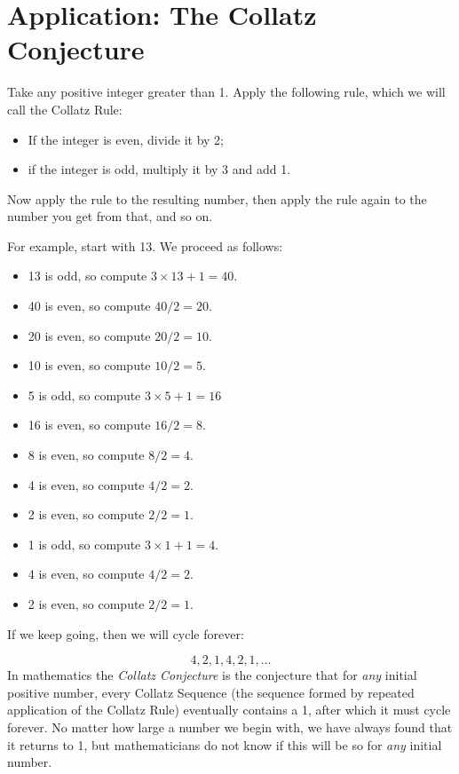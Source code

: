 \documentclass[]{book}
\providecommand{\tightlist}{%
  \setlength{\itemsep}{0pt}\setlength{\parskip}{0pt}}
\theoremstyle{definition}
\theoremstyle{definition}
\theoremstyle{definition}
\theoremstyle{remark}
\begin{document}
{\section{Application: The Collatz Conjecture}\label{collatz-conjecture}

Take any positive integer greater than 1. Apply the following rule,
which we will call the Collatz Rule:

\begin{itemize}
\tightlist
\item
  If the integer is even, divide it by 2;
\item
  if the integer is odd, multiply it by 3 and add 1.
\end{itemize}

Now apply the rule to the resulting number, then apply the rule again to
the number you get from that, and so on.

For example, start with 13. We proceed as follows:

\begin{itemize}
\tightlist
\item
  13 is odd, so compute \(3 \times 13 + 1 = 40\).
\item
  40 is even, so compute \(40/2 = 20\).
\item
  20 is even, so compute \(20/2 = 10\).
\item
  10 is even, so compute \(10/2 = 5\).
\item
  5 is odd, so compute \(3 \times 5+ 1 = 16\)
\item
  16 is even, so compute \(16/2 = 8\).
\item
  8 is even, so compute \(8/2 = 4\).
\item
  4 is even, so compute \(4/2 = 2\).
\item
  2 is even, so compute \(2/2 = 1\).
\item
  1 is odd, so compute \(3 \times 1 + 1 = 4\).
\item
  4 is even, so compute \(4/2 = 2\).
\item
  2 is even, so compute \(2/2 = 1\).
\end{itemize}

If we keep going, then we will cycle forever:

\[4, 2, 1, 4, 2, 1, \ldots\] In mathematics the \emph{Collatz
Conjecture} is the conjecture that for \emph{any} initial positive
number, every Collatz Sequence (the sequence formed by repeated
application of the Collatz Rule) eventually contains a 1, after which it
must cycle forever. No matter how large a number we begin with, we have
always found that it returns to 1, but mathematicians do not know if
this will be so for \emph{any} initial number.

}
\end{document}
